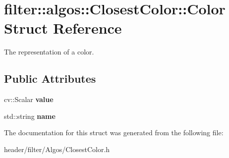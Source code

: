 \hypertarget{structfilter_1_1algos_1_1_closest_color_1_1_color}{}\section{filter\+:\+:algos\+:\+:Closest\+Color\+:\+:Color Struct Reference}
\label{structfilter_1_1algos_1_1_closest_color_1_1_color}


The representation of a color.  


\subsection*{Public Attributes}
\begin{DoxyCompactItemize}
\item 
\mbox{\label{structfilter_1_1algos_1_1_closest_color_1_1_color_a13cf5a69c92ab5df71709f91f2f11dda}} 
cv\+::\+Scalar {\bfseries value}
\item 
\mbox{\label{structfilter_1_1algos_1_1_closest_color_1_1_color_a9b77be81957a694f65721e0e881af655}} 
std\+::string {\bfseries name}
\end{DoxyCompactItemize}


The documentation for this struct was generated from the following file\+:\begin{DoxyCompactItemize}
\item 
header/filter/\+Algos/Closest\+Color.\+h\end{DoxyCompactItemize}
